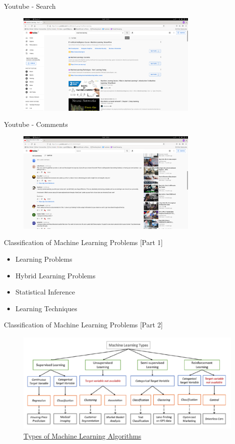 \documentclass[10pt]{beamer}
\begin{document}
\begin{frame}{Youtube - Search}
\begin{figure}
    \includegraphics[height=5cm]{images/yt-2.png}
\end{figure}
\end{frame}

\begin{frame}{Youtube - Comments}
\begin{figure}
    \includegraphics[height=5cm]{images/yt-5.png}
\end{figure}
\end{frame}



\begin{frame}{Classification of Machine Learning Problems [Part 1]}
    \begin{itemize}
        \item Learning Problems
        \item Hybrid Learning Problems
        \item Statistical Inference
        \item Learning Techniques
    \end{itemize}
\end{frame}

\begin{frame}{Classification of Machine Learning Problems [Part 2]}
\begin{figure}
    \includegraphics[height=5cm]{images/categorization.png}
    \caption{\href{https://en.proft.me/2015/12/24/types-machine-learning-algorithms/}{Types of Machine Learning Algorithms}}
\end{figure}
\end{frame}
\end{document}
